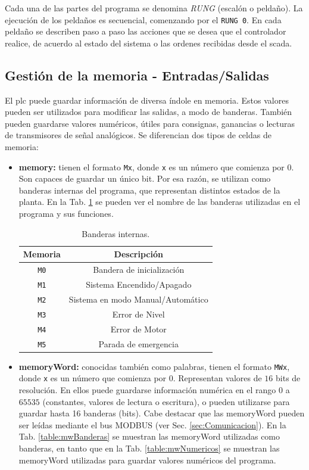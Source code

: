 Cada una de las partes del programa se denomina \emph{RUNG} (escalón o
peldaño).
La ejecución de los peldaños es secuencial, comenzando por el  \verb|RUNG 0|.
En cada peldaño se describen paso a paso las acciones que se desea que
el controlador realice, de acuerdo al estado del sistema o las ordenes
recibidas desde el \gls{scada}.

\subsection{Gestión de la memoria - Entradas/Salidas}

El \gls{plc} puede guardar información de diversa índole en memoria.
Estos valores pueden ser utilizados para modificar las salidas, a
modo de banderas.
También pueden guardarse valores numéricos, útiles para consignas,
ganancias o lecturas de transmisores de señal analógicos.
Se diferencian dos tipos de celdas de memoria:

\begin{itemize}
 \item \textbf{\gls{memory}:} tienen el formato \verb|Mx|, donde \verb|x| es un
número que comienza por $0$.
Son capaces de guardar un único bit.
Por esa razón, se utilizan como banderas internas del programa, que representan
distintos estados de la planta.
En la Tab. \ref{table:Banderasinternas} se pueden ver el nombre
de las banderas utilizadas en el programa y sus funciones.
\begin{table}[ht]
\renewcommand{\arraystretch}{1.3}
\centering
\begin{tabular}{c||c}
\hline
\bfseries Memoria & \bfseries Descripción\\
\hline \hline
\verb|M0|  & Bandera de inicialización\\
\verb|M1|  & Sistema Encendido/Apagado\\
\verb|M2|  & Sistema en modo Manual/Automático\\
\verb|M3|  & Error de Nivel\\
\verb|M4|  & Error de Motor\\
\verb|M5|  & Parada de emergencia\\
\hline
\end{tabular}
\caption{Banderas internas.}
\label{table:Banderasinternas}
\end{table}

 \item \textbf{\gls{memoryWord}:} conocidas también como palabras, tienen el
formato \verb|MWx|, donde \verb|x| es un número que comienza por $0$.
Representan valores de $16$ bits de resolución. En ellos puede guardarse
información numérica en el rango $0$ a $65535$
(constantes, valores de lectura o escritura), o pueden utilizarse para guardar
hasta 16 banderas (bits).
Cabe destacar que las \gls{memoryWord} pueden ser leídas mediante el bus MODBUS
(ver Sec. \ref{sec:Comunicacion}).
En la Tab. \ref{table:mwBanderas} se muestran las \gls{memoryWord}
utilizadas como banderas, en tanto que en la Tab.
\ref{table:mwNumericos}
se muestran las \gls{memoryWord} utilizadas para guardar valores numéricos del
programa.
\end{itemize}


